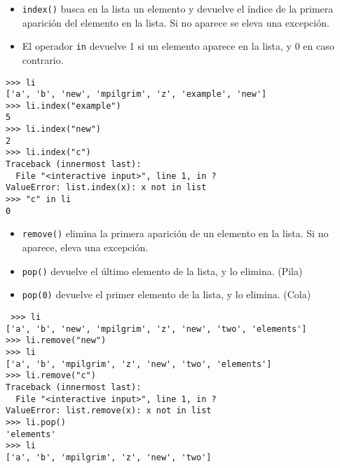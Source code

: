 \begin{frame}[fragile]
\begin{itemize}
\item \verb|index()| busca en la lista un elemento y devuelve el
  índice de la primera aparición del elemento en la lista. Si no
  aparece se eleva una excepción.
\item El operador \verb|in| devuelve 1 si un elemento aparece en la
  lista, y 0 en caso contrario.
\end{itemize}

\begin{footnotesize}
\begin{verbatim}
>>> li
['a', 'b', 'new', 'mpilgrim', 'z', 'example', 'new']
>>> li.index("example") 
5
>>> li.index("new")     
2
>>> li.index("c")       
Traceback (innermost last):
  File "<interactive input>", line 1, in ?
ValueError: list.index(x): x not in list
>>> "c" in li           
0
\end{verbatim}
\end{footnotesize}

\end{frame}




\begin{frame}[fragile]

\begin{itemize}
\item \verb|remove()| elimina la primera aparición de un elemento en
  la lista. Si no aparece, eleva una excepción.
\item \verb|pop()| devuelve el último elemento de la lista, y lo elimina. (Pila) 
\item \verb|pop(0)| devuelve el primer elemento de la lista, y lo elimina. (Cola)
\end{itemize}

\begin{footnotesize}
\begin{verbatim}
 >>> li
['a', 'b', 'new', 'mpilgrim', 'z', 'new', 'two', 'elements']
>>> li.remove("new") 
>>> li
['a', 'b', 'mpilgrim', 'z', 'new', 'two', 'elements']
>>> li.remove("c")   
Traceback (innermost last):
  File "<interactive input>", line 1, in ?
ValueError: list.remove(x): x not in list
>>> li.pop()         
'elements'
>>> li
['a', 'b', 'mpilgrim', 'z', 'new', 'two'] 
\end{verbatim}
\end{footnotesize}

\end{frame}



